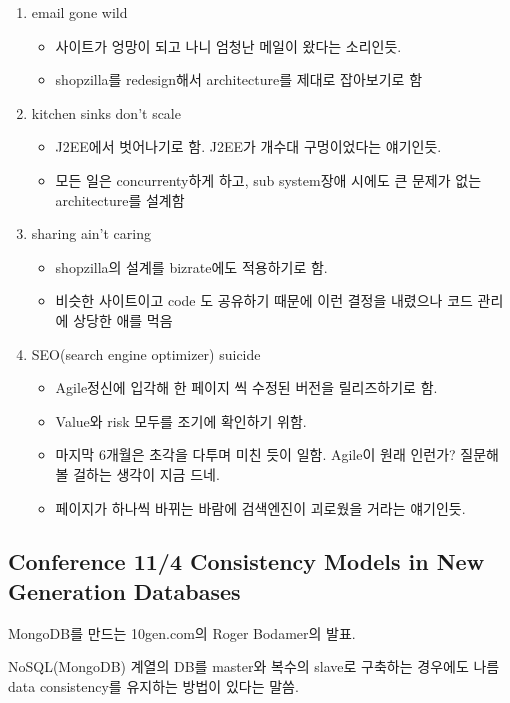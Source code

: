 \documentclass[a4paper]{article}
\begin{document}
\begin{enumerate}
\item email gone wild
    \begin{itemize}
    \item 사이트가 엉망이 되고 나니 엄청난 메일이 왔다는 소리인듯. 
    \item shopzilla를 redesign해서 architecture를 제대로 잡아보기로 함
    \end{itemize}
\item kitchen sinks don’t scale
    \begin{itemize}
    \item J2EE에서 벗어나기로 함. J2EE가 개수대 구멍이었다는 얘기인듯.
    \item 모든 일은 concurrenty하게 하고, sub system장애 시에도 큰 문제가 없는 architecture를 설계함
    \end{itemize}
\item sharing ain't caring
    \begin{itemize}
    \item shopzilla의 설계를 bizrate에도 적용하기로 함.
    \item 비슷한 사이트이고 code 도 공유하기 때문에 이런 결정을 내렸으나 코드 관리에 상당한 애를 먹음
    \end{itemize}
\item SEO(search engine optimizer) suicide
    \begin{itemize}
    \item Agile정신에 입각해 한 페이지 씩 수정된 버전을 릴리즈하기로 함.
    \item Value와 risk 모두를 조기에 확인하기 위함.
    \item 마지막 6개월은 초각을 다투며 미친 듯이 일함. Agile이 원래 인런가? 질문해 볼 걸하는 생각이 지금 드네.
    \item 페이지가 하나씩 바뀌는 바람에  검색엔진이 괴로웠을 거라는 얘기인듯.
    \end{itemize}
\end{enumerate}
 
\subsection{Conference 11/4 Consistency Models in New Generation Databases}
 
MongoDB를 만드는 10gen.com의 Roger Bodamer의 발표.
 
NoSQL(MongoDB) 계열의 DB를 master와 복수의 slave로 구축하는 경우에도
나름 data consistency를 유지하는 방법이 있다는 말씀.
 
\end{document}
